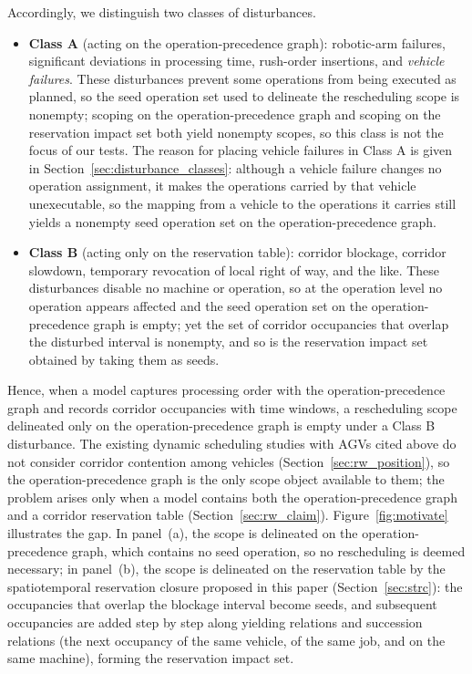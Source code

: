 \documentclass[manuscript,screen,review]{acmart}
\begin{document}
Accordingly, we distinguish two classes of disturbances.
\begin{itemize}[leftmargin=1.5em,itemsep=0.25em]
\item \textbf{Class A} (acting on the operation-precedence graph): robotic-arm failures, significant deviations in processing time, rush-order insertions, and \emph{vehicle failures}.
These disturbances prevent some operations from being executed as planned, so the seed operation set used to delineate the rescheduling scope is nonempty;
scoping on the operation-precedence graph and scoping on the reservation impact set both yield nonempty scopes, so this class is not the focus of our tests.
The reason for placing vehicle failures in Class A is given in Section~\ref{sec:disturbance_classes}: although a vehicle failure changes no operation assignment,
it makes the operations carried by that vehicle unexecutable, so the mapping from a vehicle to the operations it carries still yields a nonempty seed operation set on the operation-precedence graph.
\item \textbf{Class B} (acting only on the reservation table): corridor blockage, corridor slowdown, temporary revocation of local right of way, and the like.
These disturbances disable no machine or operation, so at the operation level no operation appears affected and the seed operation set on the operation-precedence graph is empty;
yet the set of corridor occupancies that overlap the disturbed interval is nonempty, and so is the reservation impact set obtained by taking them as seeds.
\end{itemize}
Hence, when a model captures processing order with the operation-precedence graph and records corridor occupancies with time windows,
a rescheduling scope delineated only on the operation-precedence graph is empty under a Class B disturbance.
The existing dynamic scheduling studies with AGVs cited above do not consider corridor contention among vehicles (Section~\ref{sec:rw_position}),
so the operation-precedence graph is the only scope object available to them; the problem arises only when a model contains both the operation-precedence graph and a corridor reservation table (Section~\ref{sec:rw_claim}).
Figure~\ref{fig:motivate} illustrates the gap. In panel~(a), the scope is delineated on the operation-precedence graph, which contains no seed operation, so no rescheduling is deemed necessary;
in panel~(b), the scope is delineated on the reservation table by the spatiotemporal reservation closure proposed in this paper (Section~\ref{sec:strc}): the occupancies that overlap the blockage interval become seeds,
and subsequent occupancies are added step by step along yielding relations and succession relations (the next occupancy of the same vehicle, of the same job, and on the same machine), forming the reservation impact set.
\end{document}
